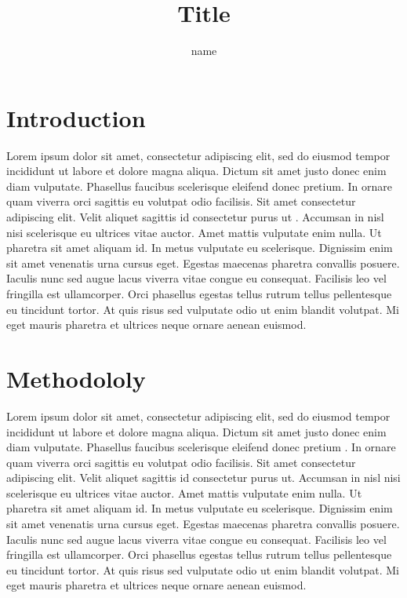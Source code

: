 \documentclass[letterpaper,10pt]{article}
\begin{document}
\title{Title}


\author{name }

\address{  University..}







\section{Introduction}
Lorem ipsum dolor sit amet, consectetur adipiscing elit, sed do eiusmod tempor incididunt ut labore et dolore magna aliqua. Dictum sit amet justo donec enim diam vulputate. Phasellus faucibus scelerisque eleifend donec pretium. In ornare quam viverra orci sagittis eu volutpat odio facilisis. Sit amet consectetur adipiscing elit. Velit aliquet sagittis id consectetur purus ut \cite{quan2019edge,Tranfield2003,Wang2018}. Accumsan in nisl nisi scelerisque eu ultrices vitae auctor. Amet mattis vulputate enim nulla. Ut pharetra sit amet aliquam id. In metus vulputate eu scelerisque. Dignissim enim sit amet venenatis urna cursus eget. Egestas maecenas pharetra convallis posuere. Iaculis nunc sed augue lacus viverra vitae congue eu consequat. Facilisis leo vel fringilla est ullamcorper. Orci phasellus egestas tellus rutrum tellus pellentesque eu tincidunt tortor. At quis risus sed vulputate odio ut enim blandit volutpat. Mi eget mauris pharetra et ultrices neque ornare aenean euismod.
\section{Methodololy}
Lorem ipsum dolor sit amet, consectetur adipiscing elit, sed do eiusmod tempor incididunt ut labore et dolore magna aliqua. Dictum sit amet justo donec enim diam vulputate. Phasellus faucibus scelerisque eleifend donec pretium \cite{xiang2017sar}. In ornare quam viverra orci sagittis eu volutpat odio facilisis. Sit amet consectetur adipiscing elit. Velit aliquet sagittis id consectetur purus ut. Accumsan in nisl nisi scelerisque eu ultrices vitae auctor\cite{qin2018edge}. Amet mattis vulputate enim nulla. Ut pharetra sit amet aliquam id. In metus vulputate eu scelerisque. Dignissim enim sit amet venenatis urna cursus eget. Egestas maecenas pharetra convallis posuere. Iaculis nunc sed augue lacus viverra vitae congue eu consequat. Facilisis leo vel fringilla est ullamcorper. Orci phasellus egestas tellus rutrum tellus pellentesque eu tincidunt tortor. At quis risus sed vulputate odio ut enim blandit volutpat. Mi eget mauris pharetra et ultrices neque ornare aenean euismod.
\end{document}
